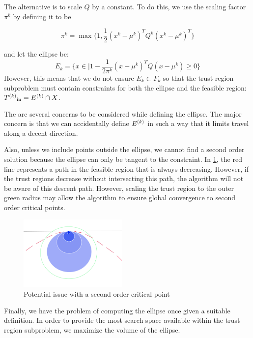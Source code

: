 The alternative is to scale $Q$ by a constant.
To do this, we use the scaling factor $\pi^k$ by defining it to be

$$\pi^k = \max \{1, \frac 1 {2} (x^{k} - \mu^{k})^T Q^k (x^{k} - \mu^{k})^T \}$$

and let the ellipse be:
$$E_k = \{x \in \mathbb | 1 - \frac 1 {2\pi^k} (x - \mu^{k})^T Q (x - \mu^{k}) \ge 0\} $$
However, this means that we do not ensure $E_k \subset F_k$ so that the trust region subproblem must contain constraints for both the ellipse and the feasible region: ${T^{(k)}}_{\text{in}} = {E^{(k)}} \cap X$.

The are several concerns to be considered while defining the ellipse.
The major concern is that we can accidentally define ${E^{(k)}}$ in such a way that it limits travel along a decent direction.


Also, unless we include points outside the ellipse, we cannot find a second order solution because the ellipse can only be tangent to the constraint.
In \cref{fbns}, the red line represents a path in the feasible region that is always decreasing.
However, if the trust regions decrease without intersecting this path, the algorithm will not be aware of this descent path.
However, scaling the trust region to the outer green radius may allow the algorithm to ensure global convergence to second order critical points.

\begin{figure}[h]
    \centering
    \includegraphics[width=200px]{images/second_order_critical_point.png}
    \caption{Potential issue with a second order critical point}
    \label{fbns}
\end{figure}



Finally, we have the problem of computing the ellipse once given a suitable definition.
In order to provide the most search space available within the trust region subproblem, we maximize the volume of the ellipse.

